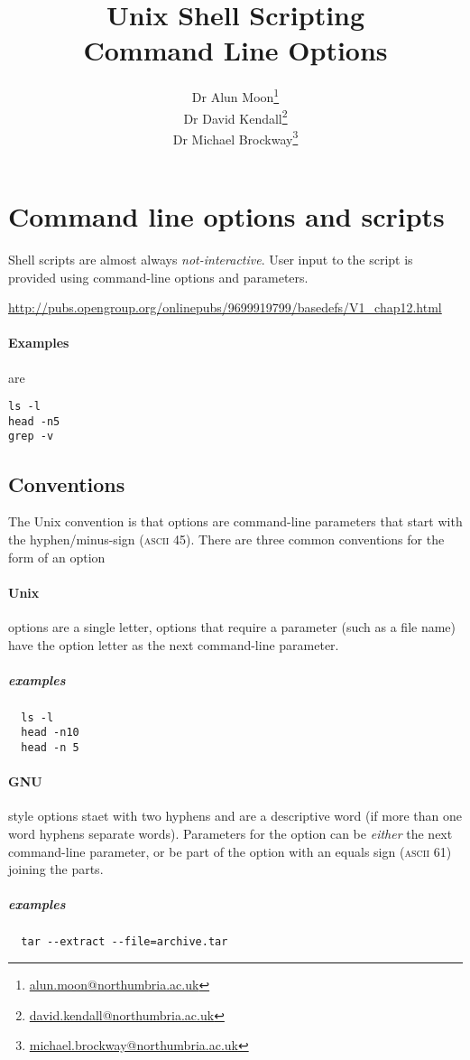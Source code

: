 \documentclass{article}
\title{Unix Shell Scripting \\ Command Line Options}
\author{%
Dr Alun Moon\thanks{\url{alun.moon@northumbria.ac.uk}}\\
Dr David Kendall\thanks{\url{david.kendall@northumbria.ac.uk}}\\
Dr Michael Brockway\thanks{\url{michael.brockway@northumbria.ac.uk}}
}
\begin{document}
\maketitle
\newpage
\section{Command line options and scripts}
Shell scripts are almost always \emph{not-interactive}.
User input to the script is provided using command-line options and parameters.

\url{http://pubs.opengroup.org/onlinepubs/9699919799/basedefs/V1_chap12.html}

\paragraph{Examples} are
\begin{verbatim}
ls -l
head -n5
grep -v
\end{verbatim}

\subsection{Conventions}
The Unix convention is that options are command-line parameters that start with the hyphen/minus-sign (\textsc{ascii} 45).  There are three common conventions for the form of an option

\paragraph{Unix} options are a single letter, options that require a parameter (such as a file name) have the option letter as the next command-line parameter.
\subparagraph{examples}
\begin{verbatim}
  ls -l
  head -n10
  head -n 5
\end{verbatim}

\paragraph{GNU} style options staet with two hyphens and are a descriptive word (if more than one word hyphens separate words).  Parameters for the option can be \emph{either} the next command-line parameter, or be part of the option with an equals sign (\textsc{ascii} 61) joining the parts.
\subparagraph{examples}
\begin{verbatim}
  tar --extract --file=archive.tar
\end{verbatim}
\end{document}
